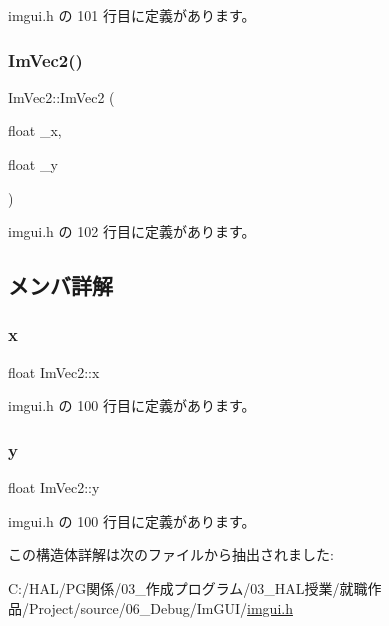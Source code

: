  imgui.\+h の 101 行目に定義があります。

\mbox{\label{struct_im_vec2_af2fd51a6c4bf6290676b235533b92c0d}} 
\subsubsection{\texorpdfstring{Im\+Vec2()}{ImVec2()}\hspace{0.1cm}{\footnotesize\ttfamily [2/2]}}
{\footnotesize\ttfamily Im\+Vec2\+::\+Im\+Vec2 (\begin{DoxyParamCaption}\item[{float}]{\+\_\+x,  }\item[{float}]{\+\_\+y }\end{DoxyParamCaption})\hspace{0.3cm}{\ttfamily [inline]}}



 imgui.\+h の 102 行目に定義があります。



\subsection{メンバ詳解}
\mbox{\label{struct_im_vec2_a5802a68560961ed8cb8cc5fb2a244c2d}} 
\subsubsection{\texorpdfstring{x}{x}}
{\footnotesize\ttfamily float Im\+Vec2\+::x}



 imgui.\+h の 100 行目に定義があります。

\mbox{\label{struct_im_vec2_a1f9d136ca837e147b793b19d25a3a618}} 
\subsubsection{\texorpdfstring{y}{y}}
{\footnotesize\ttfamily float Im\+Vec2\+::y}



 imgui.\+h の 100 行目に定義があります。



この構造体詳解は次のファイルから抽出されました\+:\begin{DoxyCompactItemize}
\item 
C\+:/\+H\+A\+L/\+P\+G関係/03\+\_\+作成プログラム/03\+\_\+\+H\+A\+L授業/就職作品/\+Project/source/06\+\_\+\+Debug/\+Im\+G\+U\+I/\mbox{\hyperlink{imgui_8h}{imgui.\+h}}\end{DoxyCompactItemize}
